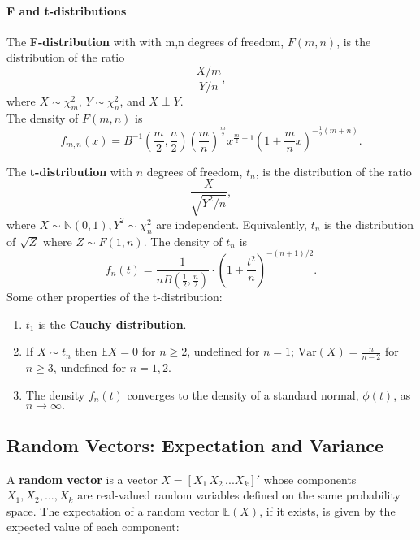 \documentclass[12pt,oneside]{article}
\begin{document}
\paragraph{F and t-distributions}
The \textbf{F-distribution} with with m,n degrees of freedom, $F(m,n)$, is the distribution of the ratio
\[\frac{X/m}{Y/n},\]
where $X \sim \chi_m^2$, $Y \sim \chi_n^2$, and $X \perp Y$. \\




The density of $F(m,n)$  is
\[f_{m,n}(x) = B^{-1} \left(\frac{m}{2}, \frac{n}{2}\right) \left(\frac{m}{n}\right)^{\frac{m}{2}} x^{\frac{m}{2}-1}\left(1+\frac{m}{n}x\right)^{-\frac{1}{2} (m+n)}. \]

\noindent The \textbf{t-distribution} with $n$ degrees of freedom, $t_n$, is the distribution of the ratio
\[\frac{X}{\sqrt{Y^2/n}},\]
where $X\sim \mathbb{N}(0,1), Y^2 \sim \chi^2_n$ are independent.  Equivalently, $t_n$ is the distribution of $\sqrt{Z}$ where $Z \sim F(1,n)$. The density of $t_n$ is
\[f_n(t) = \frac{1}{nB\left(\frac{1}{2},\frac{n}{2}\right)} \cdot \left(1+\frac{t^2}{n}\right)^{-(n+1)/2}. \]
Some other properties of the t-distribution:
\begin{enumerate}
\item $t_1$ is the \textbf{Cauchy distribution}.
\item If $X \sim t_n$ then $\mathbb{E}X = 0$ for $n \geq 2$, undefined for $n=1$; $\mbox{Var}(X) = \frac{n}{n-2}$ for $n \geq 3$, undefined for $n=1,2$.
\item The density $f_n(t)$ converges to the density of a standard normal, $\phi(t)$, as $n \rightarrow \infty.$
\end{enumerate}


\subsection{Random Vectors: Expectation and Variance}
A \textbf{random vector} is a vector $X = [X_1 \, X_2 \, ... X_k]'$ whose components $X_1, X_2,...,X_k$ are real-valued random variables defined on the same probability space.  The expectation of a random vector $\mathbb{E}(X)$, if it exists, is given by the expected value of each component:
\end{document}
